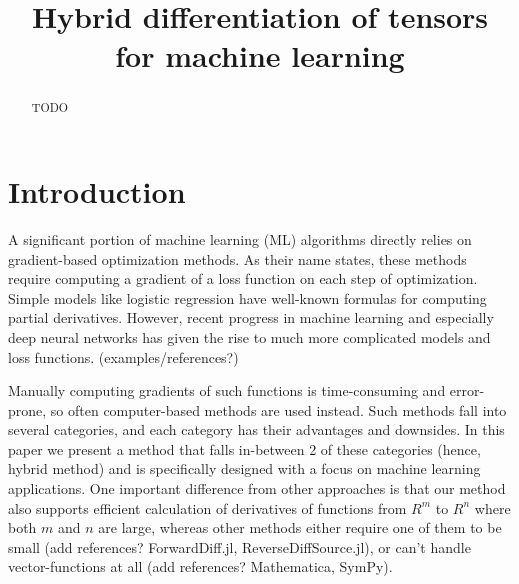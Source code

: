 \documentclass[conference]{IEEEtran}
\begin{document}
\title{Hybrid differentiation of tensors \\ for machine learning}


\author{
\and
{}
}

\maketitle


\begin{abstract}
TODO


\end{abstract}


\IEEEpeerreviewmaketitle


\section{Introduction}

A significant portion of machine learning (ML) algorithms directly relies on gradient-based optimization methods. As their name states, these methods require computing a gradient of a loss function on each step of optimization. Simple models like logistic regression have well-known formulas for computing partial derivatives. However, recent progress in machine learning and especially deep neural networks has given the rise to much more complicated models and loss functions. (examples/references?) 

Manually computing gradients of such functions is time-consuming and error-prone, so often computer-based methods are used instead. Such methods fall into several categories, and each category has their advantages and downsides. In this paper we present a method that falls in-between 2 of these categories (hence, hybrid method) and is specifically designed with a focus on machine learning applications. One important difference from other approaches is that our method also supports efficient calculation of derivatives of functions from $R^m$ to $R^n$ where both $m$ and $n$ are large, whereas other methods either require one of them to be small (add references? ForwardDiff.jl, ReverseDiffSource.jl), or can't handle vector-functions at all (add references? Mathematica, SymPy). 
\end{document}
